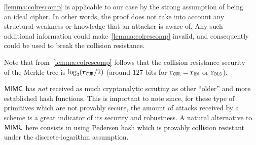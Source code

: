 \begin{notebox}
   \cref{lemma:colrescomp} is applicable to our case by the strong assumption of \mimcPrime{\rCURVE} being an ideal cipher. In other words, the proof does not take into account any structural weakness or knowledge that an attacker is aware of. Any such additional information could make~\cref{lemma:colrescomp} invalid, and consequently could be used to break the collision resistance.
\end{notebox}

\begin{remark}
    Note that from~\cref{lemma:colrescomp} follows that the collision resistance security of the \zeth{} Merkle tree is $\log_2(\mathtt{r_{CUR}}/2)$ (around $127$ bits for $\mathtt{r_{CUR}} = \mathtt{r_{BN}}$ or $\mathtt{r_{BLS}}$).
\end{remark}

\begin{notebox}
    $\mathsf{MIMC{}}$ has \emph{not} received as much cryptanalytic scrutiny as other ``older'' and more established hash functions. This is important to note since, for these type of primitives which are not provably secure, the amount of attacks received by a scheme is a great indicator of its security and robustness.
    A natural alternative to $\mathsf{MIMC{}}$ here consists in using Pedersen hash which is provably collision resistant under the discrete-logarithm assumption.
\end{notebox}
